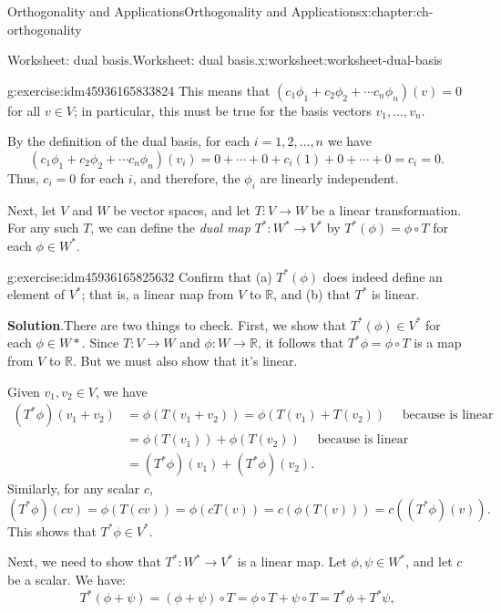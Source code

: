 \documentclass[oneside,10pt,]{book}
\newcommand{\blocktitlefont}{\relax}
\numberwithin{equation}{section}
\newcommand{\R}{\mathbb{R}}
\newcommand{\amp}{&}
\begin{document}
\begin{chapterptx}{Orthogonality and Applications}{}{Orthogonality and Applications}{}{}{x:chapter:ch-orthogonality}
\begin{worksheet-section}{Worksheet: dual basis.}{}{Worksheet: dual basis.}{}{}{x:worksheet:worksheet-dual-basis}
\begin{divisionexercise}{1}{}{}{g:exercise:idm45936165833824}
This means that \((c_1\phi_1+c_2\phi_2+\cdots c_n\phi_n)(v)=0\) for all \(v\in V\); in particular, this must be true for the basis vectors \(v_1,\ldots, v_n\).%
\par
By the definition of the dual basis, for each \(i=1,2,\ldots, n\) we have%
\begin{equation*}
(c_1\phi_1+c_2\phi_2+\cdots c_n\phi_n)(v_i) = 0+\cdots + 0 +c_i(1)+0+\cdots + 0 = c_i = 0\text{.}
\end{equation*}
Thus, \(c_i=0\) for each \(i\), and therefore, the \(\phi_i\) are linearly independent.%
\end{divisionexercise}%
Next, let \(V\) and \(W\) be vector spaces, and let \(T:V\to W\) be a linear transformation. For any such \(T\), we can define the \emph{dual map} \(T^*:W^*\to V^*\) by \(T^*(\phi) = \phi\circ T\) for each \(\phi\in W^*\).%
\begin{divisionexercise}{2}{}{}{g:exercise:idm45936165825632}%
Confirm that (a) \(T^*(\phi)\) does indeed define an element of \(V^*\); that is, a linear map from \(V\) to \(\R\), and (b) that \(T^*\) is linear.%
\par\smallskip%
\noindent\textbf{\blocktitlefont Solution}.\label{g:solution:idm45936165821488}{}\hypertarget{g:solution:idm45936165821488}{}\quad{}There are two things to check. First, we show that \(T^*(\phi)\in V^*\) for each \(\phi\in W*\). Since \(T:V\to W\) and \(\phi:W\to \R\), it follows that \(T^*\phi = \phi\circ T\) is a map from \(V\) to \(\R\). But we must also show that it's linear.%
\par
Given \(v_1, v_2\in V\), we have%
\begin{align*}
(T^*\phi)(v_1+v_2) \amp = \phi(T(v_1+v_2))=\phi(T(v_1)+T(v_2)) \quad \text{ because  is linear}\\
\amp =\phi(T(v_1))+\phi(T(v_2)) \quad \text{ because  is linear}\\
\amp =(T^*\phi)(v_1)+(T^*\phi)(v_2)\text{.}
\end{align*}
Similarly, for any scalar \(c\),%
\begin{equation*}
(T^*\phi)(cv) = \phi(T(cv))=\phi(cT(v))=c(\phi(T(v)))=c((T^*\phi)(v))\text{.}
\end{equation*}
This shows that \(T^*\phi\in V^*\).%
\par
Next, we need to show that \(T^*:W^*\to V^*\) is a linear map. Let \(\phi,\psi\in W^*\), and let \(c\) be a scalar. We have:%
\begin{equation*}
T^*(\phi+\psi) = (\phi+\psi)\circ T = \phi\circ T+\psi\circ T = T^*\phi+T^*\psi\text{,}

\end{equation*}
\end{divisionexercise}
\end{worksheet-section}
\end{chapterptx}
\end{document}
